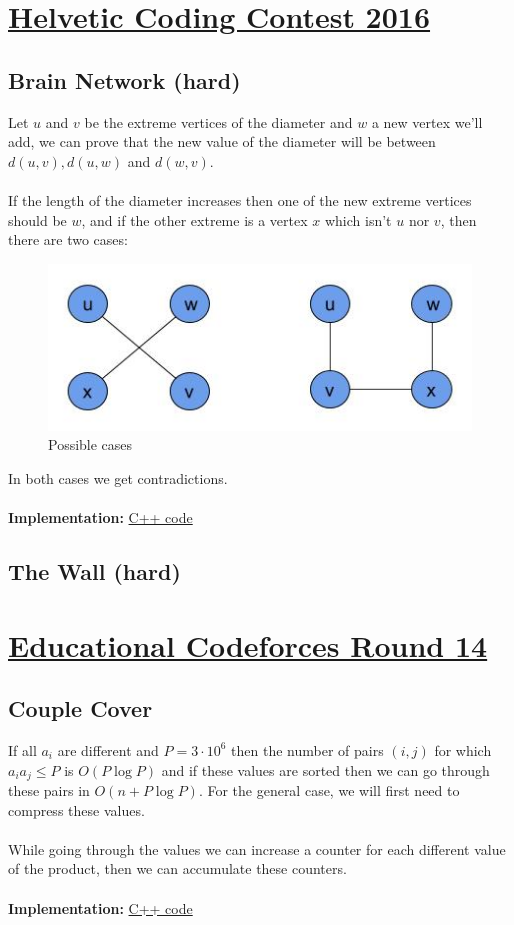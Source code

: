 \documentclass[a4paper,12pt]{article}
\begin{document}
\section{\href{http://codeforces.com/contest/690}{Helvetic Coding Contest 2016}}

\subsection{Brain Network (hard)}

Let $u$ and $v$ be the extreme vertices of the diameter and $w$ a new vertex we'll add,
we can prove that the new value of the diameter will be between $d(u,v), d(u,w)$ and $d(w,v)$.
\\ \\
If the length of the diameter increases then one of the new extreme vertices should be $w$,
and if the other extreme is a vertex $x$ which isn't $u$ nor $v$, then there
are two cases:

\begin{figure}[!ht]
\centering
\includegraphics[scale=0.6]{img/helvetic-c.jpg}
\caption{Possible cases}
\end{figure}

In both cases we get contradictions.
\\ \\
\textbf{Implementation:} \href{http://codeforces.com/contest/690/submission/19389500}{C++ code}

\subsection{The Wall (hard)}

\section{\href{http://codeforces.com/contest/691}{Educational Codeforces Round 14}}

\subsection{Couple Cover}

If all $a_i$ are different and $P = 3 \cdot 10^6$ then the number of pairs $(i,j)$ for which $a_i a_j \leq P$ is $O(P\log P)$ and if these values are sorted then we can go through these pairs in $O(n + P\log P)$. For the general case, we will first need to compress these values.
\\ \\
While going through the values we can increase a counter for each different value of the product, then we can accumulate these counters.
\\ \\
\textbf{Implementation:} \href{http://codeforces.com/contest/691/submission/19352079}{C++ code}
\end{document}
